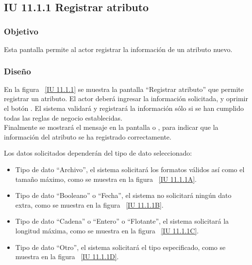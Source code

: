 \newpage 
\subsection{IU 11.1.1 Registrar atributo}

\subsubsection{Objetivo}
	
	Esta pantalla permite al actor registrar la información de un atributo nuevo.

\subsubsection{Diseño}

    En la figura ~\ref{IU 11.1.1} se muestra la pantalla ``Registrar atributo'' que permite registrar un atributo. El actor deberá ingresar la información solicitada,
    y oprimir el botón . El sistema validará y registrará la información sólo si se han cumplido todas las reglas de negocio establecidas.  \\
    
    Finalmente se mostrará el mensaje  en la pantalla  o , para indicar que la información del atributo
    se ha registrado correctamente.        

	Los datos solicitados dependerán del tipo de dato seleccionado:
	\begin{itemize}
		\item Tipo de dato ``Archivo'', el sistema solicitará los formatos válidos así como el tamaño máximo, como se muestra en la figura ~\ref{IU 11.1.1A}.
		\item Tipo de dato ``Booleano'' o ``Fecha'', el sistema no solicitará ningún dato extra, como se muestra en la figura ~\ref{IU 11.1.1B}.
		\item Tipo de dato ``Cadena'' o ``Entero'' o ``Flotante'', el sistema solicitará la longitud máxima, como se muestra en la figura ~\ref{IU 11.1.1C}.
		\item Tipo de dato ``Otro'', el sistema solicitará el tipo especificado, como se muestra en la figura ~\ref{IU 11.1.1D}.
	\end{itemize}
	

